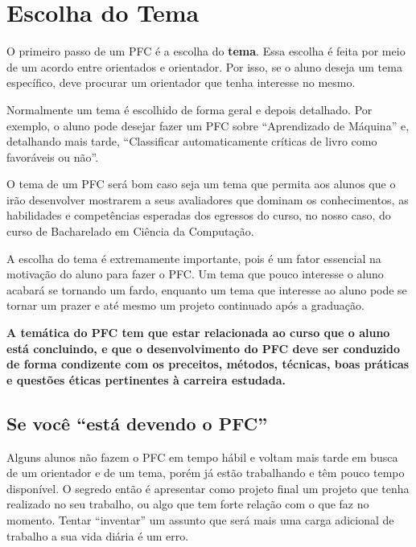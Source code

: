 
\chapter{Escolha do Tema}

O primeiro passo de um PFC é a escolha do \textbf{tema}. Essa escolha é feita por meio de um acordo entre orientados e orientador. Por isso, se o aluno deseja um tema específico, deve procurar um orientador que tenha interesse no mesmo.

Normalmente um tema é escolhido de forma geral e depois detalhado. Por exemplo, o aluno pode desejar fazer um PFC sobre “Aprendizado de Máquina” e, detalhando mais tarde, “Classificar automaticamente críticas de livro como favoráveis ou não”.

O tema de um PFC será bom caso seja um tema que permita aos alunos que o irão desenvolver mostrarem a seus avaliadores que dominam os conhecimentos, as habilidades e competências esperadas dos egressos do curso, no nosso caso, do curso de Bacharelado em Ciência da Computação.

A escolha do tema é extremamente importante, pois é um fator essencial na motivação do aluno para fazer o PFC. Um tema que pouco interesse o aluno acabará se tornando um fardo, enquanto um tema que interesse ao aluno pode se tornar um prazer e até mesmo um projeto continuado após a graduação.

\textbf{A temática do PFC tem que estar relacionada ao curso que o aluno está concluindo, e que o desenvolvimento do PFC deve ser conduzido de forma condizente com os preceitos, métodos, técnicas, boas práticas e questões éticas pertinentes à carreira estudada. }

\section{Se você ``está devendo o PFC''}

Alguns alunos não fazem o PFC em tempo hábil e voltam mais tarde em busca de um orientador e de um tema, porém já estão trabalhando e têm pouco tempo disponível. O segredo então é apresentar como projeto final um projeto que tenha realizado no seu trabalho, ou algo que tem forte relação com o que faz no momento. Tentar ``inventar'' um assunto que será mais uma carga adicional de trabalho a sua vida diária é um erro.